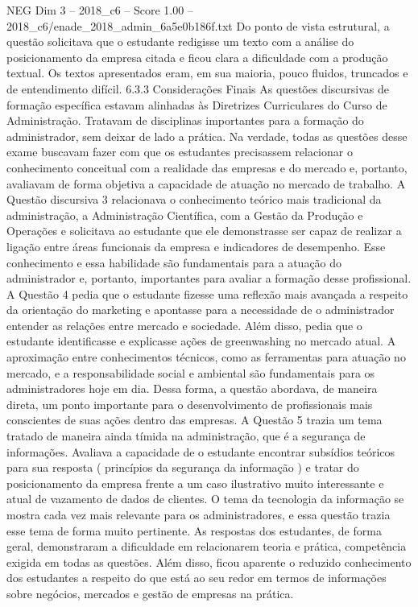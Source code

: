 \begin{textsample}{NEG Dim 3 – 2018\_c6 – Score 1.00 – 2018\_c6/enade\_2018\_admin\_6a5e0b186f.txt}
Do ponto de vista estrutural, a questão solicitava que o estudante redigisse um texto com a análise do posicionamento da empresa citada e ficou clara a dificuldade com a produção textual.
Os textos apresentados eram, em sua maioria, pouco fluidos, truncados e de entendimento difícil. 6.3.3 Considerações Finais As questões discursivas de formação específica estavam alinhadas às Diretrizes Curriculares do Curso de Administração.
Tratavam de disciplinas importantes para a formação do administrador, sem deixar de lado a prática.
Na verdade, todas as questões desse exame buscavam fazer com que os estudantes precisassem relacionar o conhecimento conceitual com a realidade das empresas e do mercado e, portanto, avaliavam de forma objetiva a capacidade de atuação no mercado de trabalho.
A Questão discursiva 3 relacionava o conhecimento teórico mais tradicional da administração, a Administração Científica, com a Gestão da Produção e Operações e solicitava ao estudante que ele demonstrasse ser capaz de realizar a ligação entre áreas funcionais da empresa e indicadores de desempenho.
Esse conhecimento e essa habilidade são fundamentais para a atuação do administrador e, portanto, importantes para avaliar a formação desse profissional.
A Questão 4 pedia que o estudante fizesse uma reflexão mais avançada a respeito da orientação do marketing e apontasse para a necessidade de o administrador entender as relações entre mercado e sociedade.
Além disso, pedia que o estudante identificasse e explicasse ações de greenwashing no mercado atual.
A aproximação entre conhecimentos técnicos, como as ferramentas para atuação no mercado, e a responsabilidade social e ambiental são fundamentais para os administradores hoje em dia.
Dessa forma, a questão abordava, de maneira direta, um ponto importante para o desenvolvimento de profissionais mais conscientes de suas ações dentro das empresas.
A Questão 5 trazia um tema tratado de maneira ainda tímida na administração, que é a segurança de informações.
Avaliava a capacidade de o estudante encontrar subsídios teóricos para sua resposta ( princípios da segurança da informação ) e tratar do posicionamento da empresa frente a um caso ilustrativo muito interessante e atual de vazamento de dados de clientes.
O tema da tecnologia da informação se mostra cada vez mais relevante para os administradores, e essa questão trazia esse tema de forma muito pertinente.
As respostas dos estudantes, de forma geral, demonstraram a dificuldade em relacionarem teoria e prática, competência exigida em todas as questões.
Além disso, ficou aparente o reduzido conhecimento dos estudantes a respeito do que está ao seu redor em termos de informações sobre negócios, mercados e gestão de empresas na prática.

\end{textsample}
